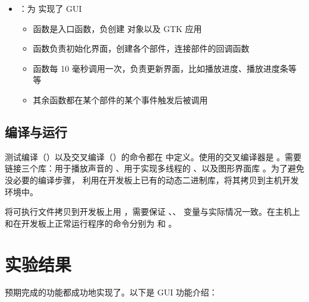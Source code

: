 \begin{itemize}
    \item {}：为  实现了 GUI
    \begin{itemize}
        \item {} 函数是入口函数，负创建  对象以及 GTK 应用
        \item {} 函数负责初始化界面，创建各个部件，连接部件的回调函数
        \item {} 函数每 10 毫秒调用一次，负责更新界面，比如播放进度、播放进度条等等
        \item 其余函数都在某个部件的某个事件触发后被调用
    \end{itemize}
\end{itemize}

\subsection{编译与运行}

测试编译（）以及交叉编译（）的命令都在  中定义。使用的交叉编译器是 。需要链接三个库：用于播放声音的  、用于实现多线程的 、以及图形界面库 。为了避免没必要的编译步骤， 利用在开发板上已有的动态二进制库，将其拷贝到主机开发环境中。

将可执行文件拷贝到开发板上用 ，需要保证 、、 变量与实际情况一致。在主机上和在开发板上正常运行程序的命令分别为  和 。

\newpage

\section{实验结果}

预期完成的功能都成功地实现了。以下是 GUI 功能介绍：

